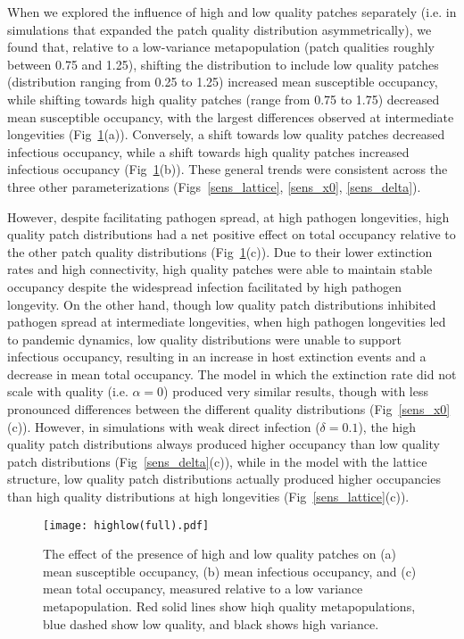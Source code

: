 \documentclass{svjour3}
\begin{document}
When we explored the influence of high and low quality patches separately (i.e. in simulations that expanded the patch quality distribution asymmetrically), we found that, relative to a low-variance metapopulation (patch qualities roughly between 0.75 and 1.25), shifting the distribution to include low quality patches (distribution ranging from 0.25 to 1.25) increased mean susceptible occupancy, while shifting towards high quality patches (range from 0.75 to 1.75) decreased mean susceptible occupancy, with the largest differences observed at intermediate longevities (Fig~\ref{sens}(a)).  Conversely, a shift towards low quality patches decreased infectious occupancy, while a shift towards high quality patches increased infectious occupancy (Fig~\ref{sens}(b)).  These general trends were consistent across the three other parameterizations (Figs~\ref{sens_lattice}, \ref{sens_x0}, \ref{sens_delta}).  

However, despite facilitating pathogen spread, at high pathogen longevities, high quality patch distributions had a net positive effect on total occupancy relative to the other patch quality distributions (Fig~\ref{sens}(c)).  Due to their lower extinction rates and high connectivity, high quality patches were able to maintain stable occupancy despite the widespread infection facilitated by high pathogen longevity.  On the other hand, though low quality patch distributions inhibited pathogen spread at intermediate longevities, when high pathogen longevities led to pandemic dynamics, low quality distributions were unable to support infectious occupancy, resulting in an increase in host extinction events and a decrease in mean total occupancy.  The model in which the extinction rate did not scale with quality (i.e. $\alpha = 0$) produced very similar results, though with less pronounced differences between the different quality distributions (Fig~\ref{sens_x0}(c)).  However, in simulations with weak direct infection ($\delta = 0.1$), the high quality patch distributions always produced higher occupancy than low quality patch distributions (Fig~\ref{sens_delta}(c)), while in the model with the lattice structure, low quality patch distributions actually produced higher occupancies than high quality distributions at high longevities (Fig~\ref{sens_lattice}(c)).

\begin{figure}
\centering
\texttt{[image: highlow(full).pdf]}
\caption{The effect of the presence of high and low quality patches on (a) mean susceptible occupancy, (b) mean infectious occupancy, and (c) mean total occupancy, measured relative to  a low variance metapopulation.  Red solid lines show hiqh quality metapopulations, blue dashed show low quality, and black shows high variance.}
\label{sens}
\end{figure}
\end{document}
